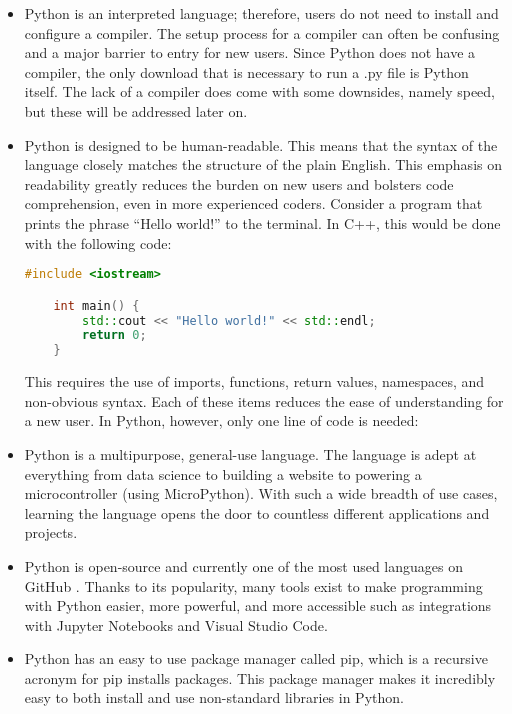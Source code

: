 \begin{itemize}
    \item Python is an interpreted language; therefore, users do not need to install and configure
    a compiler. The setup process for a compiler can often be confusing and a major barrier to entry
    for new users. Since Python does not have a compiler, the only download that is necessary to run 
    a .py file is Python itself. The lack of a compiler does come with some downsides, namely speed,
    but these will be addressed later on.
    \item Python is designed to be human-readable. This means that the syntax of the language closely
    matches the structure of the plain English. This emphasis on readability greatly reduces the
    burden on new users and bolsters code comprehension, even in more experienced coders. Consider 
    a program that prints the phrase ``Hello world!''  to the terminal. In C++, this would be done with 
    the following code:

    \begin{lstlisting}[language=C++]
    #include <iostream>

    int main() {
        std::cout << "Hello world!" << std::endl;
        return 0;
    }
    \end{lstlisting}

    This requires the use of imports, functions, return values, namespaces, and non-obvious syntax. 
    Each of these items reduces the ease of understanding for a new user. In Python, however, only one line 
    of code is needed:

    \-\hspace{1cm} 

    \item Python is a multipurpose, general-use language. The language is adept at everything from
    data science to building a website to powering a microcontroller (using MicroPython). With such 
    a wide breadth of use cases, learning the language opens the door to countless different applications 
    and projects.
    \item Python is open-source and currently one of the most used languages on GitHub \cite{github-stats}. Thanks 
    to its popularity, many tools exist to make programming with Python easier, more powerful, and more 
    accessible such as integrations with Jupyter Notebooks and Visual Studio Code.
    \item Python has an easy to use package manager called pip, which is a recursive acronym for pip
    installs packages. This package manager makes it incredibly easy to both install and use non-standard
    libraries in Python.
\end{itemize}

